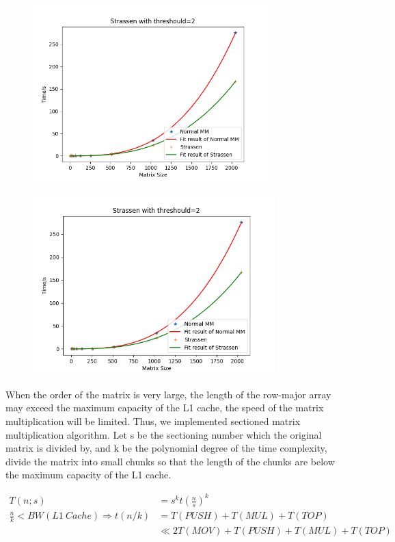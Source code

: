 \documentclass[UTF8]{ctexart}
\begin{document}
\begin{figure}[htb]
  \centering
  \includegraphics[height=6.8cm]{../ppt/slide-UIBK/th=32_ijk.png}
  \caption{}
\end{figure}

\begin{figure}[htb]
  \centering
  \includegraphics[height=7.0cm]{../ppt/slide-UIBK/th=64_ijk.png}
  \caption{}
\end{figure}

When the order of the matrix is very large, the length of the row-major
array may exceed the maximum capacity of the L1 cache, the speed of the
matrix multiplication will be limited. Thus, we implemented sectioned
matrix multiplication algorithm. Let s be the sectioning number which
the original matrix is divided by, and k be the polynomial degree of the
time complexity, divide the matrix into small chunks so that the length
of the chunks are below the maximum capacity of the L1 cache.

\begin{equation}
  \begin{aligned}
    T(n;s)                                          & =s^kt\left(\frac{n}{s}\right)^{k} \\
    \frac{n}{k} <  BW(L1\ Cache) \Rightarrow t(n/k) & =T(PUSH)+T(MUL)+T(TOP)            \\
                                                    & \ll 2T(MOV)+T(PUSH)+T(MUL)+T(TOP)
  \end{aligned}
\end{equation}
\end{document}
